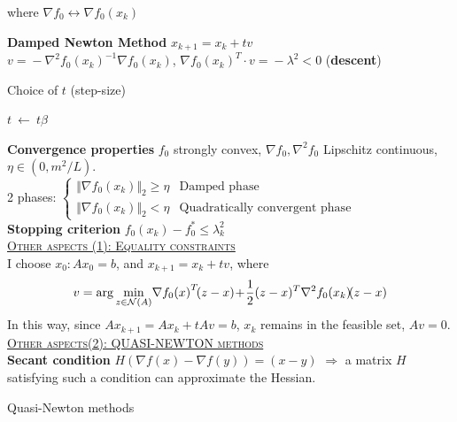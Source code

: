 \documentclass[a4paper]{article}
\begin{document}
\begin{multicols}{2}
\begin{multicols}{2}
     where $\nabla{f_0} \leftrightarrow \nabla{f_0(x_k)}$
    \end{multicols}
    \noindent
     \textbf{Damped Newton Method}  $x_{k+1}=x_k+tv$\\
     $v\!=\!-\nabla^2{f_0(x_k)}^{-1}\nabla{f_0(x_k)}$,\! $\nabla{f_0(x_k)}^T\cdot{v}\!=\!\!-\!\lambda^2\!<\!0$ \!(\textbf{descent})
     \vspace{0.05cm}
     \begin{algorithm}[H]
        \caption{Choice of $t$ (step-size) }
        \begin{algorithmic}[1]
            \State{$\alpha \in (0,\frac{1}{2}], \ \beta \in (0,1), t=1$}
                {$t \ \gets \ t \beta$}
            \EndWhile
        \end{algorithmic}
     \end{algorithm}
     \vspace{-0.5cm}
     \noindent
     \textbf{Convergence properties} $f_0$ strongly convex, $\nabla{f_0}, \nabla^2{f_0}$ Lipschitz continuous, $\eta \in (0, m^2/L)$. \\
     2 phases:
     $\begin{cases}
        \Vert \nabla{f_0(x_k)} \Vert_2 \ge \eta&\text{Damped phase}\\
        \Vert \nabla{f_0(x_k)} \Vert_2 < \eta&\text{Quadratically convergent phase}
     \end{cases}$\\
     \textbf{Stopping criterion} $f_0(x_k) - f_0^* \le \lambda_k^2$\\
     \textsc{\underline{Other aspects (1): Equality constraints}}\\
     I choose $x_0: Ax_0=b$, and $x_{k+1}=x_k+tv$, where
     \vspace{-0.2cm}
     \begin{equation*}
        \small
        v=\arg\min_{z\in\mathcal{N}(A)} {\!\nabla{f_0(x)}^T\!(z-x)\!+\!\frac{1}{2}(z-x)^T\nabla^2{f_0(x_k)}\!(z-x)}
     \end{equation*}
     In this way, since $A{x_{k+1}}=A{x_{k}}+tAv=b$, $x_k$ remains in the feasible set, $Av=0$.\\
     \noindent
     \textsc{\underline{Other aspects(2): QUASI-NEWTON methods}} \\
     \textbf{Secant condition} $H(\nabla{f(x)}-\nabla{f(y)})=(x-y)$ $\Rightarrow$ a matrix $H$ satisfying such a condition can approximate the Hessian.

     \begin{algorithm}[H]
        \caption{Quasi-Newton methods}
        \begin{algorithmic}[1]

        \end{algorithmic}
     \end{algorithm}
     
\end{multicols}
\end{document}
